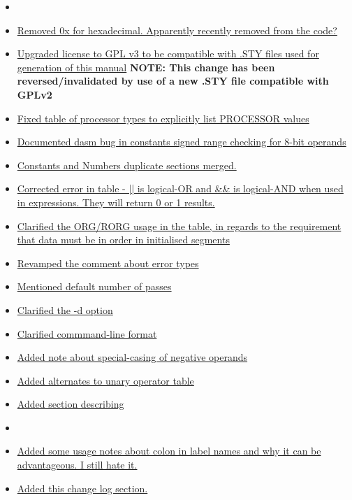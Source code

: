 \begin{itemize}
\item[]
\item \hyperref[changelog:20200824const]{Removed 0x for hexadecimal. Apparently recently removed from the code?}
\item \hyperref[changelog:20200824license]{Upgraded license to GPL v3 to be compatible with .STY files used for generation of this manual} \textbf{NOTE: This change has been reversed/invalidated by use of a new .STY file compatible with GPLv2}
\item \hyperref[changelog:20200824processor]{Fixed table of processor types to explicitly list PROCESSOR values}
\item \hyperref[changelog:20200824rangebug]{Documented dasm bug in constants signed range checking for 8-bit operands}
\item \hyperref[changelog:20200824const]{Constants and Numbers duplicate sections merged.}
\item \hyperref[changelog:20200824arithmetic]{Corrected error in table - || is logical-OR and \&\& is logical-AND when used in expressions. They will return 0 or 1 results.}
\item \hyperref[changelog:20200824org]{Clarified the ORG/RORG usage in the  table, in regards to the requirement that data must be in order in initialised segments}
\item \hyperref[changelog:20200824error]{Revamped the comment about error types}
\item \hyperref[changelog:20200824passes]{Mentioned default number of passes}
\item \hyperref[changelog:20200824developers]{Clarified the -d option}
\item \hyperref[changelog:20200824sourcefile]{Clarified commmand-line format}
\item \hyperref[changelog:specialcase]{Added note about special-casing of negative operands}
\item \hyperref[changelog:alternateunary]{Added alternates to unary operator table}
\item \hyperref[section:numberformat]{Added section describing }

\item[]
\item \hyperref[changelog:20200823colon]{Added some usage notes about colon in label names and why it can be advantageous. I still hate it.}
\item \hyperref[section:changelog]{Added this change log section.}
\end{itemize}


